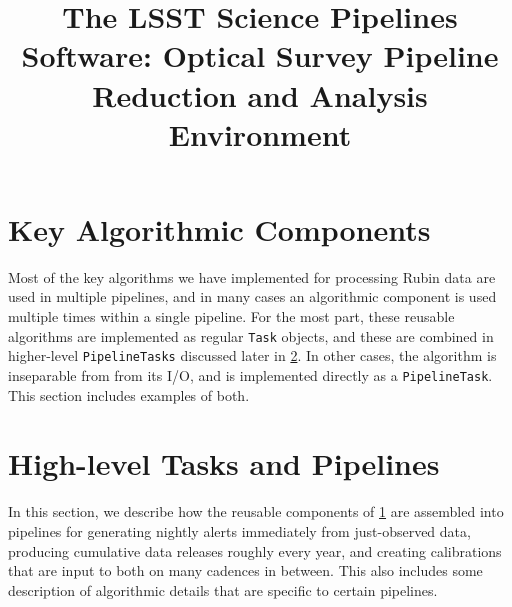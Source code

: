 \documentclass[twocolumn,longbib]{aastex7}
\begin{document}
\title{The LSST Science Pipelines Software: Optical Survey Pipeline Reduction and Analysis Environment}











\section{Key Algorithmic Components}
\label{sec:components}

Most of the key algorithms we have implemented for processing Rubin data are used in multiple pipelines, and in many cases an algorithmic component is used multiple times within a single pipeline.
For the most part, these reusable algorithms are implemented as regular \texttt{Task} objects, and these are combined in higher-level \texttt{PipelineTasks} discussed later in \ref{sec:tasks-and-pipelines}.
In other cases, the algorithm is inseparable from from its I/O, and is implemented directly as a \texttt{PipelineTask}.
This section includes examples of both.










\section{High-level Tasks and Pipelines}
\label{sec:tasks-and-pipelines}

In this section, we describe how the reusable components of \ref{sec:components} are assembled into pipelines for generating nightly alerts immediately from just-observed data, producing cumulative data releases roughly every year, and creating calibrations that are input to both on many cadences in between.
This also includes some description of algorithmic details that are specific to certain pipelines.
\end{document}
